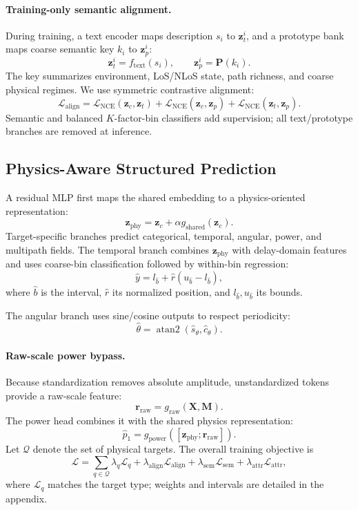 \documentclass[conference]{IEEEtran}
\begin{document}
\paragraph{Training-only semantic alignment.}
During training, a text encoder maps description $s_i$ to $\mathbf z_t^i$, and a prototype bank maps
coarse semantic key $k_i$ to $\mathbf z_p^i$:
\[
\mathbf z_t^i=f_{\mathrm{text}}(s_i),
\qquad
\mathbf z_p^i=\mathbf P(k_i).
\]
The key summarizes environment, LoS/NLoS state, path richness, and coarse physical regimes. We use
symmetric contrastive alignment:
\[
\mathcal L_{\mathrm{align}}=
\mathcal L_{\mathrm{NCE}}(\mathbf z_c,\mathbf z_t)+
\mathcal L_{\mathrm{NCE}}(\mathbf z_c,\mathbf z_p)+
\mathcal L_{\mathrm{NCE}}(\mathbf z_t,\mathbf z_p).
\]
Semantic and balanced $K$-factor-bin classifiers add supervision; all text/prototype branches are
removed at inference.

\subsection{Physics-Aware Structured Prediction}

A residual MLP first maps the shared embedding to a physics-oriented representation:
\[
\mathbf z_{\mathrm{phy}}=\mathbf z_c+\alpha g_{\mathrm{shared}}(\mathbf z_c).
\]
Target-specific branches predict categorical, temporal, angular, power, and multipath fields. The
temporal branch combines $\mathbf z_{\mathrm{phy}}$ with delay-domain features and uses coarse-bin
classification followed by within-bin regression:
\[
\hat y=l_{\hat b}+\hat r\left(u_{\hat b}-l_{\hat b}\right),
\]
where $\hat b$ is the interval, $\hat r$ its normalized position, and $l_{\hat b},u_{\hat b}$ its bounds.

The angular branch uses sine/cosine outputs to respect periodicity:
\[
\hat\theta=\operatorname{atan2}(\hat s_\theta,\hat c_\theta).
\]

\paragraph{Raw-scale power bypass.}
Because standardization removes absolute amplitude, unstandardized tokens provide a raw-scale feature:
\[
\mathbf r_{\mathrm{raw}}=g_{\mathrm{raw}}(\mathbf X,\mathbf M).
\]
The power head combines it with the shared physics representation:
\[
\hat p_1=g_{\mathrm{power}}\!\left([\mathbf z_{\mathrm{phy}};\mathbf r_{\mathrm{raw}}]\right).
\]
Let $\mathcal Q$ denote the set of physical targets. The overall training objective is
\[
\mathcal L=\sum_{q\in\mathcal Q}\lambda_q\mathcal L_q+
\lambda_{\mathrm{align}}\mathcal L_{\mathrm{align}}+
\lambda_{\mathrm{sem}}\mathcal L_{\mathrm{sem}}+
\lambda_{\mathrm{attr}}\mathcal L_{\mathrm{attr}},
\]
where $\mathcal L_q$ matches the target type; weights and intervals are detailed in the appendix.
\end{document}
